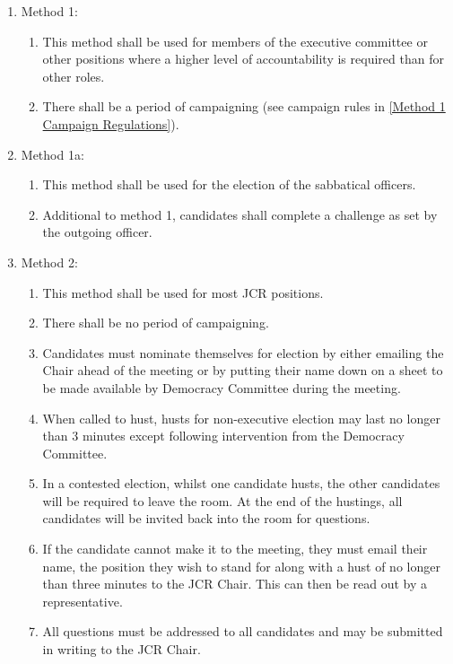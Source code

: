 \label{Election Methods}
\begin{enumerate}
    \item Method 1: 
    \begin{enumerate}
        \item This method shall be used for members of the executive committee or other positions where a higher level of accountability is required than for other roles. 
        \item There shall be a period of campaigning (see campaign rules in \ref{Method 1 Campaign Regulations}).
    \end{enumerate}
    \item Method 1a: 
    \begin{enumerate}
        \item This method shall be used for the election of the sabbatical officers.
        \item Additional to method 1, candidates shall complete a challenge as set by the outgoing officer.
    \end{enumerate}
    \item Method 2:
    \begin{enumerate}
        \item This method shall be used for most JCR positions.
        \item There shall be no period of campaigning.
        \item Candidates must nominate themselves for election by either emailing the Chair ahead of the meeting or by putting their name down on a sheet to be made available by Democracy Committee during the meeting.
        \item When called to hust, husts for non-executive election may last no longer than 3 minutes except following intervention from the Democracy Committee.
        \item In a contested election, whilst one candidate husts, the other candidates will be required to leave the room. At the end of the hustings, all candidates will be invited back into the room for questions.
        \item If the candidate cannot make it to the meeting, they must email their name, the position they wish to stand for along with a hust of no longer than three minutes to the JCR Chair. This can then be read out by a representative.
        \item All questions must be addressed to all candidates and may be submitted in writing to the JCR Chair.

\end{enumerate}
\end{enumerate}
